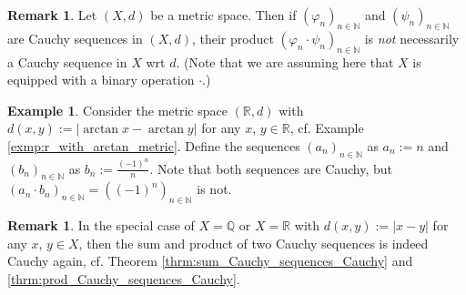 \documentclass[12pt, a4paper]{article}
\numberwithin{equation}{section}
\theoremstyle{definition}
\theoremstyle{definition}
\newtheorem{exmp}[thm]{Example} %
\newtheorem{remark}[thm]{Remark} %
\newcommand{\abs}[1]{\left\vert #1 \right\vert}
\newcommand{\seq}[1][\varphi]{\left( #1 \right)_{n \in \mathbb{N}}}
\begin{document}
	\begin{remark}
		Let $(X, d)$ be a metric space. Then if $\seq[\varphi_n]$ and $\seq[\psi_n]$ are Cauchy sequences in $(X, d)$, their product $\seq[\varphi_n \cdot \psi_n]$ is \textit{not} necessarily a Cauchy sequence in $X$ wrt $d$. (Note that we are assuming here that $X$ is equipped with a binary operation $\cdot$.)
	\end{remark}

	\begin{exmp}\label{exmp:counter_exmp_prod_Cauchy_not_Cauchy}
		Consider the metric space $(\mathbb R, d)$ with $d(x, y) := \abs{\arctan x - \arctan y}$ for any $x$, $y\in\mathbb R$, cf. Example \ref{exmp:r_with_arctan_metric}. Define the sequences $\seq[a_n]$ as $a_n := n$ and $\seq[b_n]$ as $b_n := \frac{(-1)^n}{n}$. Note that both sequences are Cauchy, but $\seq[a_n \cdot b_n] = \seq[(-1)^n]$ is not.
	\end{exmp}
	
	\begin{remark}
		In the special case of $X = \mathbb Q$ or $X = \mathbb R$ with $d(x, y) := \abs{x - y}$ for any $x$, $y\in X$, then the sum and product of two Cauchy sequences is indeed Cauchy again, cf. Theorem \ref{thrm:sum_Cauchy_sequences_Cauchy} and \ref{thrm:prod_Cauchy_sequences_Cauchy}.
	\end{remark}
	
\end{document}
